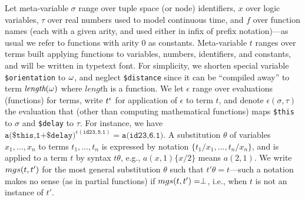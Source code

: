 \documentclass[12pt,a4paper,twoside,openright]{book}
\begin{document}
Let meta-variable $\sigma$ range over tuple space (or node) identifiers, $x$ over logic variables, $\tau$ over real numbers used to model continuous time, and $f$ over function names (each with a given arity, and used either in infix of prefix notation)---as usual we refer to functions with arity 0 as constants.
%
Meta-variable $t$ ranges over terms built applying functions to variables, numbers, identifiers, and constants, and will be written in typetext font.
%
For simplicity, we shorten special variable \texttt{\$orientation} to $\omega$, and neglect \texttt{\$distance} since it can be ``compiled away'' to term $\textit{length}(\omega)$ where $\textit{length}$ is a function.
%
We let $\epsilon$ range over evaluations (functions) for terms, write $t^\epsilon$ for application of $\epsilon$ to term $t$, and denote $\epsilon(\sigma,\tau)$ the evaluation that (other than computing mathematical functions) maps \texttt{\$this} to $\sigma$ and \texttt{\$delay} to $\tau$.
%
For instance, we have $\texttt{a(\$this,1+\$delay)}^{\epsilon(\texttt{id23},\texttt{5.1})}=\texttt{a(id23,6.1)}$.
%
A substitution $\theta$ of variables $x_1,\ldots,x_n$ to terms $t_1,\ldots,t_n$ is expressed by notation $\{t_1/x_1,\ldots,t_n/x_n\}$, and is applied to a term $t$ by syntax $t\theta$, e.g., $a(x,1)\{x/2\}$ means $a(2,1)$.
%
We write $mgs(t,t')$ for the most general substitution $\theta$ such that $t'\theta=t$---such a notation makes no sense (as in partial functions) if $mgs(t,t')=\perp$, i.e., when $t$ is not an instance of $t'$.
\end{document}
